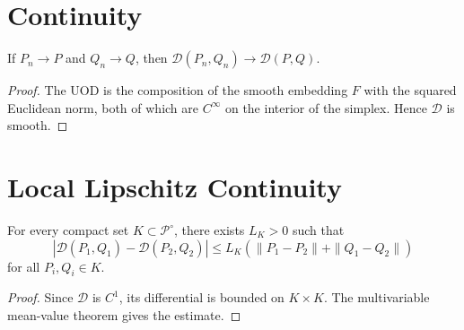 \section{Continuity}
\begin{theorem}[Continuity]
\label{ch:thm:23-3}
If \(P_n\to P\) and \(Q_n\to Q\), then
$\mathcal D(P_n,Q_n)\to\mathcal D(P,Q).$
\end{theorem}
\begin{proof} The UOD is the composition of the smooth embedding
\(F\) with the squared Euclidean norm, both of which are \(C^\infty\)
on the interior of the simplex.  Hence \(\mathcal D\) is smooth.
\end{proof}
\section{Local Lipschitz Continuity}
\begin{theorem}
\label{ch:thm:23-4}
For every compact set \(K\subset\mathcal P^\circ\), there exists
\(L_K>0\) such that
\[ |\mathcal D(P_1,Q_1)-\mathcal D(P_2,Q_2)|
\le L_K(\|P_1-P_2\|+\|Q_1-Q_2\|) \]
for all \(P_i,Q_i\in K\).
\end{theorem}
\begin{proof} Since \(\mathcal D\) is \(C^{1}\), its differential is
bounded on \(K\times K\). The multivariable mean-value theorem
gives the estimate. 
\end{proof}
